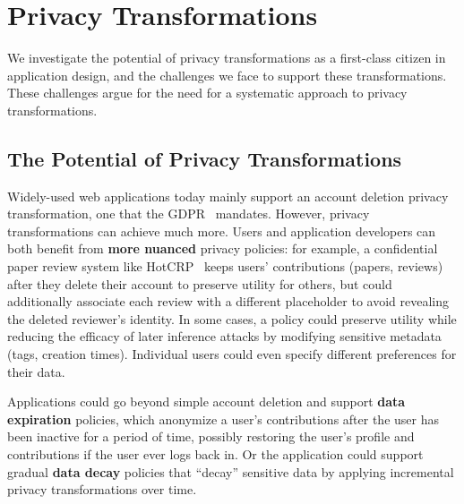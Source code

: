 \section{Privacy Transformations}
\label{sec:survey}

We investigate the potential of privacy transformations as a first-class citizen in application
design, and the challenges we face to support these transformations. These challenges argue for the
need for a systematic approach to privacy transformations.

\subsection{The Potential of Privacy Transformations}
Widely-used web applications today mainly support an account deletion privacy transformation,
one that \eg the GDPR~\cite[Art.\ 17]{eu:gdpr} mandates.
However, privacy transformations can achieve much more.
%
Users and application developers can both benefit from \textbf{more nuanced} privacy policies:
%
for example, a confidential paper review system like HotCRP~\cite{hotcrp} keeps users'
contributions (papers, reviews) after they delete their account to preserve utility for others, but
could additionally associate each review with a different placeholder to avoid revealing the deleted
reviewer's identity.
%
In some cases, a policy could preserve utility while reducing the efficacy of later inference
attacks by \eg modifying sensitive metadata (\eg tags, creation times).
%
%
%
Individual users could even specify different preferences for their data.
%
%

%
Applications could go beyond simple account deletion and support \textbf{data
expiration} policies, which anonymize a user's contributions after the user has been inactive for a
period of time, possibly restoring the user's profile and contributions if the user ever logs back
in.
%
Or the application could support gradual \textbf{data decay} policies that ``decay'' sensitive data
by applying incremental privacy transformations over time.

